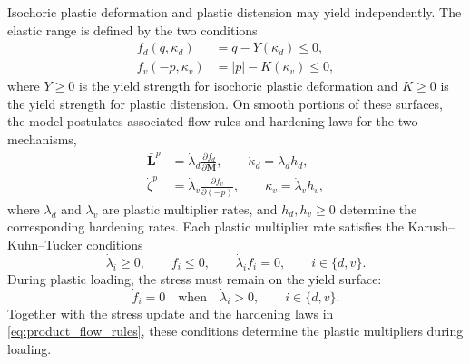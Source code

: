 \documentclass[11pt]{article}
\newcommand{\mbf}[1]{\mathbf{#1}}
\begin{document}
Isochoric plastic deformation and plastic distension may yield
independently.  The elastic range is defined by the two conditions
\begin{align*}
	f_d(q,\kappa_d)  & =q-Y(\kappa_d)\le0,
	\\
	f_v(-p,\kappa_v) & =|p|-K(\kappa_v)\le0,
\end{align*}
where \(Y\ge0\) is the yield strength for isochoric plastic deformation and
\(K\ge0\) is the yield strength for plastic distension.  On smooth portions of
these surfaces, the model postulates associated flow rules and hardening laws
for the two mechanisms,
\begin{subequations}
	\label{eq:product_flow_rules}
	\begin{align}
		\bar{\mbf L}^{p}
		 & =\dot\lambda_d\frac{\partial f_d}{\partial\mbf M},
		\qquad
		\dot\kappa_d=\dot\lambda_d h_d,
		\label{eq:true_associated_flow}                       \\
		\dot\zeta^p
		 & =\dot\lambda_v\frac{\partial f_v}{\partial(-p)},
		\qquad
		\dot\kappa_v=\dot\lambda_v h_v,
		\label{eq:distension_associated_flow}
	\end{align}
\end{subequations}
where \(\dot\lambda_d\) and \(\dot\lambda_v\) are plastic multiplier rates,
and \(h_d,h_v\ge0\) determine the corresponding hardening rates. Each plastic
multiplier rate satisfies the Karush--Kuhn--Tucker
conditions
\begin{equation*}
	\dot\lambda_i\ge0,
	\qquad
	f_i\le0,
	\qquad
	\dot\lambda_i f_i=0,
	\qquad
	i\in\{d,v\}.
\end{equation*}
During plastic loading, the stress must remain on the yield surface:
\begin{equation}
	\dot f_i=0
	\quad\text{when}\quad
	\dot\lambda_i>0,
	\qquad
	i\in\{d,v\}.
	\label{eq:consistency}
\end{equation}
Together with the stress update and the hardening laws in
\eqref{eq:product_flow_rules}, these conditions determine the plastic
multipliers during loading.
\end{document}

